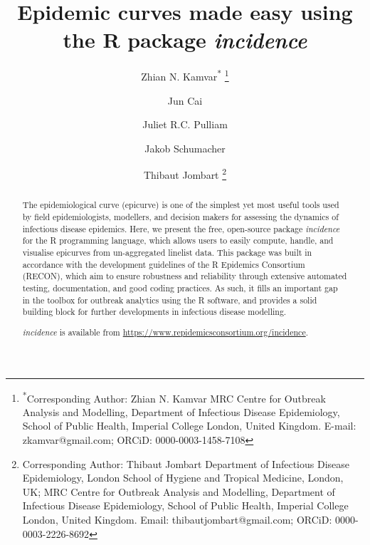 \documentclass[9pt,a4paper]{extarticle}
\begin{document}
\pagestyle{front}

\title{Epidemic curves made easy using the R package \emph{incidence}}

\author[1]{Zhian N. Kamvar\textsuperscript{*}
\footnote{\textsuperscript{*}Corresponding Author: 
Zhian N. Kamvar 
MRC Centre for Outbreak Analysis and Modelling,
Department of Infectious Disease Epidemiology, School of Public Health,
Imperial College London, United Kingdom.
E-mail: zkamvar@gmail.com; ORCiD: 0000-0003-1458-7108}}
\author[2]{Jun Cai}
\author[3]{Juliet R.C. Pulliam}
\author[4]{Jakob Schumacher}
\author[1,5]{Thibaut Jombart
\footnote{Corresponding Author:
Thibaut Jombart
Department of Infectious Disease Epidemiology,
London School of Hygiene and Tropical Medicine, London, UK;
MRC Centre for Outbreak Analysis and Modelling,
Department of Infectious Disease Epidemiology, School of Public Health,
Imperial College London, United Kingdom.
Email: thibautjombart@gmail.com; ORCiD: 0000-0003-2226-8692
}}



\maketitle
\thispagestyle{front}

\begin{abstract}

The epidemiological curve (epicurve) is one of the simplest yet most useful tools used by field epidemiologists, modellers, and decision makers for assessing the dynamics of infectious disease epidemics.
Here, we present the free, open-source package \textit{incidence} for the R programming language, which allows users to easily compute, handle, and visualise epicurves from un-aggregated linelist data.
This package was built in accordance with the development guidelines of the R Epidemics Consortium (RECON), which aim to ensure robustness and reliability through extensive automated testing, documentation, and good coding practices. As such, it fills an important gap in the toolbox for outbreak analytics using the R software, and provides a solid building block for further developments in infectious disease modelling. 

\textit{incidence} is available from \url{https://www.repidemicsconsortium.org/incidence}.


\end{abstract}
\end{document}
